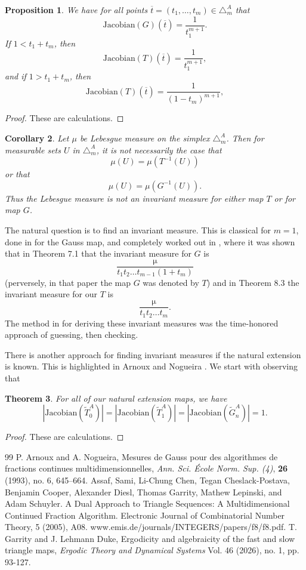 \documentclass[10pt,a4paper]{amsart}
\newtheorem{theorem}{Theorem}[section]
\newtheorem{prop}[theorem]{Proposition}
\newtheorem{corollary}[theorem]{Corollary}
\begin{document}
 
\begin{prop} We have for all points $\overline{t} = (t_1, \ldots, t_m) \in \triangle_m^A$ that 
$$\mbox{Jacobian}(G) (\overline{t}) = \frac{1}{t_1^{m+1}}.$$
If $ 1< t_1+ t_m$, then 
$$\mbox{Jacobian}(T) (\overline{t}) = \frac{1}{t_1^{m+1}},$$
and if $1>t_1+ t_m$, then
$$\mbox{Jacobian}(T) (\overline{t}) = \frac{1}{(1-t_m)^{m+1}},$$
\end{prop}
\begin{proof}
These are calculations.
\end{proof}
 \begin{corollary} Let $\mu$ be Lebesgue measure on the simplex $\triangle_m^A$.  Then for measurable sets $U$ in $\triangle_m^A$, it is not necessarily the case that 
 $$\mu(U) = \mu(T^{-1}(U))$$
 or that 
 $$\mu(U) = \mu(G^{-1}(U)).$$
Thus the Lebesgue measure is not an invariant measure for either  map $T$ or for map $G$.
 \end{corollary}
 
The natural question is to find an invariant measure.  This is classical for $m=1$, done in \cite{Ass} for the Gauss map, and completely worked out in \cite{Garrity-Lehmann Duke}, where it was shown that in Theorem 7.1 that the invariant measure for $G$ is 
$$\frac{\mathrm{\mu}}{t_1 t_2 \ldots t_{m-1} ( 1 + t_m)}$$
(perversely, in that paper the map $G$ was denoted by $T$) and in Theorem 8.3 the invariant measure for our $T$ is 
$$\frac{\mathrm{\mu}}{t_1 t_2 \ldots t_{m}}.$$
The method in \cite{Garrity-Lehmann Duke}  for deriving these invariant measures was the time-honored approach of guessing, then checking.

There is another approach for finding invariant measures if the natural extension is known.  This is highlighted in Arnoux and Nogueira \cite{Arnoux-Nogueira-93}.  We start with observing that 


\begin{theorem} For all of our  natural extension maps, we have
$$|\mbox{Jacobian}(\tilde{T}_0^A )| = |\mbox{Jacobian}(\tilde{T}_1^A )| =  |\mbox{Jacobian}(\tilde{G}_n^A )| =1. $$

\end{theorem}

\begin{proof} These are calculations.
\end{proof}


\begin{thebibliography}{99}
 P. Arnoux and A. Nogueira, Mesures de Gauss pour des algorithmes de fractions continues multidimensionnelles, \emph{Ann. Sci. \'Ecole Norm. Sup. (4)}, \textbf{26} (1993), no. 6, 645--664.
 Assaf, Sami, Li-Chung Chen, Tegan Cheslack-Postava, Benjamin Cooper, Alexander Diesl, Thomas Garrity, Mathew Lepinski, and Adam Schuyler. A Dual Approach to Triangle Sequences: A Multidimensional Continued Fraction Algorithm. Electronic Journal of Combinatorial Number Theory, 5 (2005), A08. www.emis.de/journals/INTEGERS/papers/f8/f8.pdf.
 T. Garrity and J. Lehmann Duke, Ergodicity and algebraicity of the fast and slow triangle maps, {\it Ergodic Theory and Dynamical Systems} Vol. 46 (2026), no. 1, pp. 93-127.
\end{thebibliography}
\end{document}
